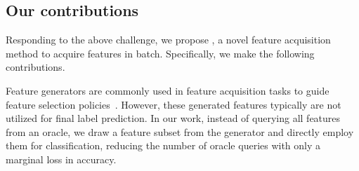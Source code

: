 \documentclass[letterpaper]{article}
\renewcommand{\cite}{\citep}
\begin{document}
 
\subsection{Our contributions}

Responding to the above challenge,   we propose \our, a novel feature acquisition method to acquire features in batch. 
Specifically, we make the following contributions.
 

Feature generators are commonly used in feature acquisition tasks to guide feature selection policies~\cite{gsm,eddi}. However, these generated features typically are not utilized for final label prediction. In our work, instead of querying all features from an oracle, we draw a feature subset from the generator and directly employ them for classification, reducing the number of oracle queries with only a marginal loss in accuracy.
\end{document}
